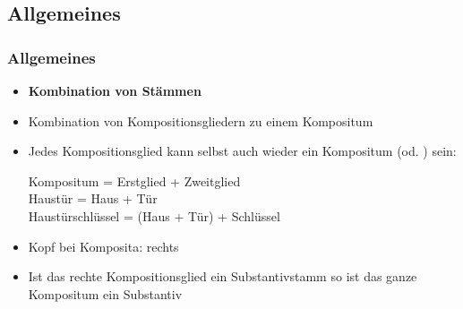 \subsection{Allgemeines}
\begin{frame}
\frametitle{Allgemeines}

\begin{itemize}
	\item \textbf{Kombination von Stämmen}
	\item Kombination von Kompositionsgliedern zu einem Kompositum
	\item Jedes Kompositionsglied kann selbst auch wieder ein Kompositum (od. ) sein:
	
	\ea
	\glll Kompositum = Erstglied + Zweitglied \\
		Haustür = Haus + Tür \\
		Haustürschlüssel = {(Haus + Tür)} + Schlüssel\\
	\z
		 
	\item Kopf bei Komposita: rechts
	\item Ist das rechte Kompositionsglied ein Substantivstamm so ist das ganze Kompositum ein Substantiv
\end{itemize}


\end{frame}


